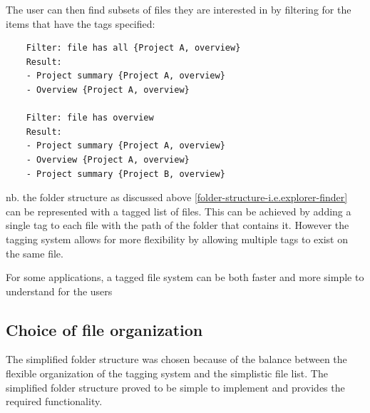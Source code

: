 The user can then find subsets of files they are interested in by
filtering for the items that have the tags specified:

\begin{verbatim}
    Filter: file has all {Project A, overview}
    Result:
    - Project summary {Project A, overview}
    - Overview {Project A, overview}

    Filter: file has overview
    Result:
    - Project summary {Project A, overview}
    - Overview {Project A, overview}
    - Project summary {Project B, overview}
\end{verbatim}

nb. the folder structure as discussed above
\ref{folder-structure-i.e.explorer-finder} can be represented with a tagged list
of files. This can be achieved by adding a single tag to each file with the path
of the folder that contains it. However the tagging system allows for more
flexibility by allowing multiple tags to exist on the same file.

For some applications, a tagged file system can be both faster and more simple
to understand for the users\cite{ASI:ASI22906}

\subsection{Choice of file organization}\label{choice-of-file-organization}

The simplified folder structure was chosen because of the balance
between the flexible organization of the tagging system and the
simplistic file list. The simplified folder structure proved to be
simple to implement and provides the required functionality.


